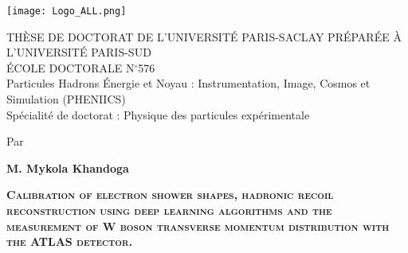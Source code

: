 {\begin{center}
	\vspace{-3.5cm}
	\texttt{[image: Logo\_ALL.png]}\\
	\vspace{1cm}
	
	\textcolor{violet!80!red!80!black}{{{\uppercase{\Large Thèse de Doctorat de L'Université Paris-Saclay Préparée à l'Université Paris-Sud}}}}\\
	\vspace{1cm}
	ÉCOLE DOCTORALE N$^{\circ}$576\\
	Particules Hadrons Énergie et Noyau : Instrumentation, Image, Cosmos et Simulation (PHENIICS)\\
	Spécialité de doctorat : Physique des particules expérimentale\par
	\vspace{1.5cm}
 	Par\par  \large \textbf{M. Mykola Khandoga} \par
	\vspace{1cm}
	\Large \textsc{\textcolor{SchoolColor}{
	\textbf{Calibration of electron shower shapes, hadronic recoil reconstruction using deep learning algorithms and the measurement of W boson transverse momentum distribution with the ATLAS detector.}}}\par
\end{center}

\vspace{2cm}
\vspace{1cm}
\hspace{-1cm}{  Composition de jury: \par}
}


